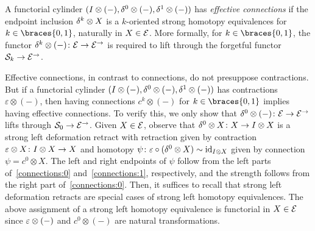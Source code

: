 \documentclass[reqno,10pt,a4paper,oneside,draft]{amsart}
\begin{document}
\begin{definition} \label{def:effective-connections}
A functorial cylinder $(I \otimes (-), \delta^0 \otimes (-), \delta^1 \otimes (-))$ has \emph{effective connections} if the endpoint inclusion $\delta^k \otimes X$ is a $k$-oriented strong homotopy equivalences for $k \in \braces{0, 1}$, naturally in $X \in \mathcal{E}$.
More formally, for $k \in \braces{0, 1}$, the functor $\delta^k \otimes (-) \colon \mathcal{E} \to \mathcal{E}^\to$ is required to lift through the forgetful functor $\mathcal{S}_k \to \mathcal{E}^\to$.
\end{definition}

\begin{remark} \label{connections-are-effective}
Effective connections, in contrast to connections, do not presuppose contractions.
But if a functorial cylinder $(I \otimes (-), \delta^0 \otimes (-), \delta^1 \otimes (-))$ has contractions $\varepsilon \otimes (-)$, then having connections $c^k \otimes (-)$ for $k \in \braces{0, 1}$ implies having effective connections.
To verify this, we only show that $\delta^0 \otimes (-) \colon \mathcal{E} \to \mathcal{E}^\to$ lifts through $\mathcal{S}_0 \to \mathcal{E}^\to$.
Given $X \in \mathcal{E}$, observe that $\delta^0 \otimes X \colon X \to I \otimes X$ is a strong left deformation retract with retraction given by contraction $\varepsilon \otimes X \colon I \otimes X \to X$ and homotopy $\psi \colon \varepsilon \mathbin{\circ} (\delta^0 \otimes X) \sim \operatorname{id}_{I \otimes X}$ given by connection $\psi = c^0 \otimes X$.
The left and right endpoints of $\psi$ follow from the left parts of~\eqref{connections:0} and~\eqref{connections:1}, respectively, and the strength follows from the right part of~\eqref{connections:0}.
Then, it suffices to recall that strong left deformation retracts are special cases of strong left homotopy equivalences.
The above assignment of a strong left homotopy equivalence is functorial in $X \in \mathcal{E}$ since $\varepsilon \otimes (-)$ and $c^0 \otimes (-)$ are natural transformations.
\end{remark}
\end{document}
